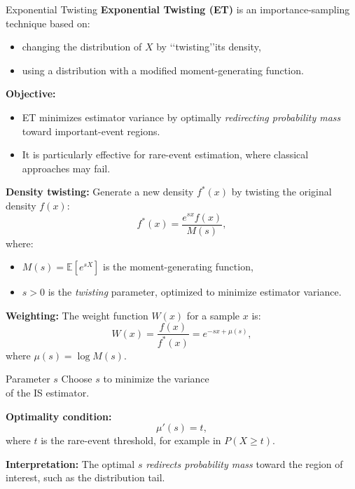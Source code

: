 \documentclass{beamer}
\begin{document}
\begin{frame}{Exponential Twisting}
    \textbf{Exponential Twisting (ET)} is an importance-sampling technique based on:
    \begin{itemize}
        \item changing the distribution of $X$ by \lq\lq twisting\rq\rq \space its density,
        \item using a distribution with a modified moment-generating function.
    \end{itemize}

    \vspace{0.5cm}
    \textbf{Objective:}
    \begin{itemize}
        \item ET minimizes estimator variance by optimally \textit{redirecting probability mass} toward important-event regions.
        \item It is particularly effective for rare-event estimation, where classical approaches may fail.
    \end{itemize}
\end{frame}

\begin{frame}
    \textbf{Density twisting:} Generate a new density $f^*(x)$ by twisting the original density $f(x)$:
    \[
    f^*(x) = \frac{e^{sx} f(x)}{M(s)},
    \]
    where:
    \begin{itemize}
        \item $M(s) = \mathbb{E}[e^{sX}]$ is the moment-generating function,
        \item $s > 0$ is the \textit{twisting} parameter, optimized to minimize estimator variance.
    \end{itemize}

    \vspace{0.5cm}
    \textbf{Weighting:} The weight function $W(x)$ for a sample $x$ is:
    \[
    W(x) = \frac{f(x)}{f^*(x)} = e^{-sx + \mu(s)},
    \]
    where $\mu(s) = \log M(s)$.
\end{frame}

\begin{frame}{Parameter $s$}
    Choose $s$ to minimize the variance \\ of the IS estimator.

    \vspace{0.5cm}
    \textbf{Optimality condition:}
    \[
    \mu'(s) = t,
    \]
    where $t$ is the rare-event threshold, for example in $P(X \geq t)$.

    \vspace{0.5cm}
    \textbf{Interpretation:} The optimal $s$ \textit{redirects probability mass} toward the region of interest, such as the distribution tail.
\end{frame}
\end{document}
